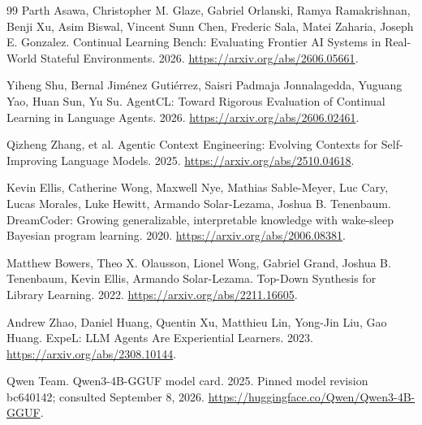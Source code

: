 \begin{thebibliography}{99}
Parth Asawa, Christopher M. Glaze, Gabriel Orlanski, Ramya Ramakrishnan, Benji Xu, Asim Biswal, Vincent Sunn Chen, Frederic Sala, Matei Zaharia, Joseph E. Gonzalez.
Continual Learning Bench: Evaluating Frontier AI Systems in Real-World Stateful Environments.
2026.
\url{https://arxiv.org/abs/2606.05661}.

Yiheng Shu, Bernal Jim{\'e}nez Guti{\'e}rrez, Saisri Padmaja Jonnalagedda, Yuguang Yao, Huan Sun, Yu Su.
{AgentCL}: Toward Rigorous Evaluation of Continual Learning in Language Agents.
2026.
\url{https://arxiv.org/abs/2606.02461}.

Qizheng Zhang, et al.
Agentic Context Engineering: Evolving Contexts for Self-Improving Language Models.
2025.
\url{https://arxiv.org/abs/2510.04618}.

Kevin Ellis, Catherine Wong, Maxwell Nye, Mathias Sable-Meyer, Luc Cary, Lucas Morales, Luke Hewitt, Armando Solar-Lezama, Joshua B. Tenenbaum.
DreamCoder: Growing generalizable, interpretable knowledge with wake-sleep Bayesian program learning.
2020.
\url{https://arxiv.org/abs/2006.08381}.

Matthew Bowers, Theo X. Olausson, Lionel Wong, Gabriel Grand, Joshua B. Tenenbaum, Kevin Ellis, Armando Solar-Lezama.
Top-Down Synthesis for Library Learning.
2022.
\url{https://arxiv.org/abs/2211.16605}.

Andrew Zhao, Daniel Huang, Quentin Xu, Matthieu Lin, Yong-Jin Liu, Gao Huang.
ExpeL: LLM Agents Are Experiential Learners.
2023.
\url{https://arxiv.org/abs/2308.10144}.

{Qwen Team}.
{Qwen3-4B-GGUF} model card.
2025.
Pinned model revision bc640142; consulted September 8, 2026.
\url{https://huggingface.co/Qwen/Qwen3-4B-GGUF}.

\end{thebibliography}
